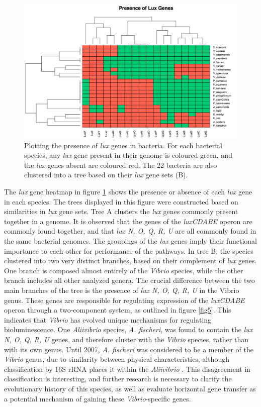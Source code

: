 \documentclass[fleqn,12pt]{wlscirep}
\begin{document}
\begin{figure}[ht]
\includegraphics[width=\textwidth]{2.png}
\caption{Plotting the presence of \textit{lux} genes in bacteria. For each bacterial species, any \textit{lux} gene present in their genome is coloured green, and the \textit{lux} genes absent are coloured red. The 22 bacteria are also clustered into a tree based on their \textit{lux} gene sets (B).}
\centering
\label{fig2}
\end{figure}

The \textit{lux} gene heatmap in figure \ref{fig2} shows the presence or absence of each \textit{lux} gene in each species. The trees displayed in this figure were constructed based on similarities in \textit{lux} gene sets. Tree A clusters the \textit{lux} genes commonly present together in a genome. It is observed that the genes of the \textit{luxCDABE} operon are commonly found together, and that \textit{lux N, O, Q, R, U} are all commonly found in the same bacterial genomes. The groupings of the \textit{lux} genes imply their functional importance to each other for performance of the pathways. In tree B, the species clustered into two very distinct branches, based on their complement of \textit{lux} genes. One branch is composed almost entirely of the \textit{Vibrio} species, while the other branch includes all other analyzed genera. The crucial difference between the two main branches of the tree is the presence of \textit{lux N, O, Q, R, U} in the Vibrio genus. These genes are responsible for regulating expression of the \textit{luxCDABE} operon through a two-component system, as outlined in figure \ref{fig5}. This indicates that \textit{Vibrio} has evolved unique mechanisms for regulating bioluminescence. One \textit{Aliivibrio} species, \textit{A. fischeri}, was found to contain the \textit{lux N, O, Q, R, U} genes, and therefore cluster with the \textit{Vibrio} species, rather than with its own genus. Until 2007, \textit{A. fischeri} was considered to be a member of the \textit{Vibrio} genus, due to similarity between physical characteristics, although classification by 16S rRNA places it within the \textit{Aliivibrio} \cite{t1}. This disagreement in classification is interesting, and further research is necessary to clarify the evolutionary history of this species, as well as evaluate horizontal gene transfer as a potential mechanism of gaining these \textit{Vibrio}-specific genes.
\end{document}
